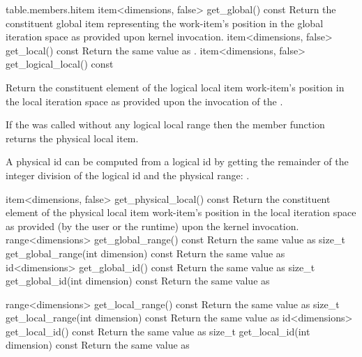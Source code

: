 {table.members.hitem}
  \addRow
    {item<dimensions, false> get_global() const}
    {
        Return the constituent global \gls{item} representing the
        work-item's position in the global iteration space as provided upon kernel invocation.
    }
  \addRow
    {item<dimensions, false> get_local() const}
    {
        Return the same value as .
    }
  \addRow
    {item<dimensions, false> get_logical_local() const}
    {
        Return the constituent element of the logical local \gls{item}
        work-item's position in the local iteration space as provided upon the invocation of the
        .

        If the  was called without any logical local range
        then the member function returns the physical local \gls{item}.

        A physical id can be computed from a logical id by getting the remainder of the integer division
        of the logical id and the physical range:
        .
    }
  \addRow
    {item<dimensions, false> get_physical_local() const}
    {
        Return the constituent element of the physical local \gls{item}
        work-item's position in the local iteration space as provided (by the user or the runtime)
        upon the kernel invocation.
    }
  \addRow
    {range<dimensions> get_global_range() const}
    {
      Return the same value as 
    }
  \addRow
    {size_t get_global_range(int dimension) const}
    {
      Return the same value as 
    }
  \addRow
    {id<dimensions> get_global_id() const}
    {
      Return the same value as 
    }
  \addRow
    {size_t get_global_id(int dimension) const}
    {
      Return the same value as 
    }

  \addRow
    {range<dimensions> get_local_range() const}
    {
      Return the same value as 
    }
  \addRow
    {size_t get_local_range(int dimension) const}
    {
      Return the same value as 
    }
  \addRow
    {id<dimensions> get_local_id() const}
    {
      Return the same value as 
    }
  \addRow
    {size_t get_local_id(int dimension) const}
    {
      Return the same value as 
    }

